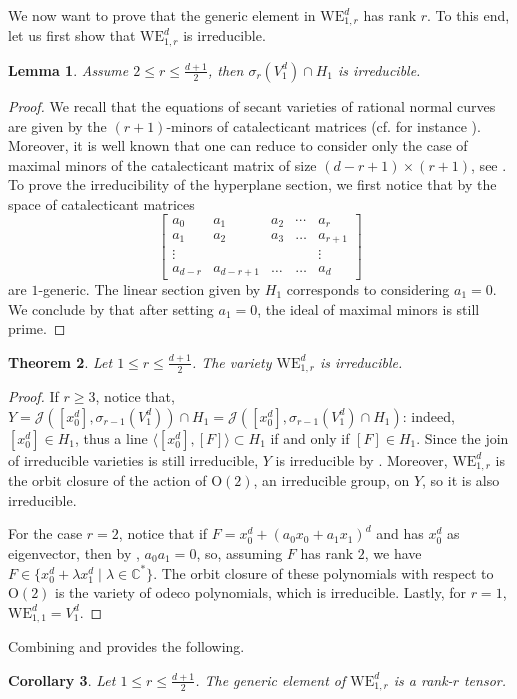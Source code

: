 \documentclass{amsart}
\newtheorem{theorem}{Theorem}
\numberwithin{theorem}{section}
\newtheorem{lemma}[theorem]{Lemma}
\newtheorem{corollary}[theorem]{Corollary}
\theoremstyle{definition}
\newcommand{\CC}{\mathbb{C}}
\begin{document}
   We now want to prove that the generic element in $\mathrm{WE}_{1,r}^d$ has rank $r$. To this end, let us first show that
   $\mathrm{WE}_{1,r}^d$ is irreducible.

   
\begin{lemma}\label{thm: irriducibilita'}
    Assume $2\leq r\leq \frac{d+1}{2}$, then $\sigma_r(V_1^d)\cap H_1$ is irreducible.
\end{lemma}
\begin{proof}
We recall that the equations of secant varieties of rational normal curves are given by the $(r+1)$-minors of catalecticant matrices (cf. for instance \cite[Section 0.1]{IarrobinoKanev}). Moreover, it is well known that one can reduce to consider only the case of maximal minors of the catalecticant matrix of size $(d-r+1)\times(r+1)$, see \cite[Lemma 2.3]{Peskine}. To prove the irreducibility of the  hyperplane section, we first notice that by \cite[Proposition 4.2]{EisenbudLinearSec} the space of catalecticant matrices $$\begin{bmatrix}
     a_0& a_1 & a_2&\cdots & a_{r}\\
     a_1 & a_2 & a_3& \dots & a_{r+1}\\
     \vdots & & & &\vdots \\
     a_{d-r}& a_{d-r+1}& \dots &\dots & a_d
 \end{bmatrix}$$ are $1$-generic. The linear section given by $H_1$ corresponds to considering $a_1=0$. We conclude by \cite[Theorem 1-(ii)]{eisenbud} that after setting $a_1=0$, the ideal of maximal minors  is still prime.
\end{proof}


\begin{theorem}\label{thm: irriducibilita'WE}
    Let $1\leq r\leq \frac{d+1}{2}$. The variety $\mathrm{WE}_{1,r}^d$ is irreducible.
\end{theorem}
\begin{proof}
     If $r\geq 3$, notice that, $Y=\mathcal J([x_0^d],\sigma_{r-1}(V_1^d))\cap H_1 =\mathcal J([x_0^d],\sigma_{r-1}(V_1^d)\cap H_1)${: indeed, $[x_0^d] \in H_1$, thus a line $\langle [x_0^d],[F]\rangle \subset H_1$ if and only if $[F] \in H_1$}. Since the join of irreducible varieties is still irreducible, $Y$ is irreducible by . Moreover, $\mathrm{WE}_{1,r}^d$ is the orbit closure of the action of $\mathrm{O}(2)$, an irreducible group, on $Y$, so it is also irreducible.

     For the case $r=2$, notice that if $F=x_0^d+(a_0x_0+a_1x_1)^d$ and has $x_0^d$ as eigenvector, then by , $a_0a_1=0$, so, assuming $F$ has rank $2$, we have $F\in\{x_0^d+\lambda x_1^d\mid \lambda\in \CC^\ast\}$. The orbit closure of these polynomials with respect to $\mathrm{O}(2)$ is the variety of odeco polynomials, which is irreducible. Lastly, for $r=1$, $\mathrm{WE}_{1,1}^d=V_{1}^d$.
\end{proof}
Combining   and  provides the following.
\begin{corollary}
Let $1\leq r\leq \frac{d+1}{2}$. The generic element of $\mathrm{WE}_{1,r}^d$ is a rank-$r$ tensor.
\end{corollary}
\end{document}
